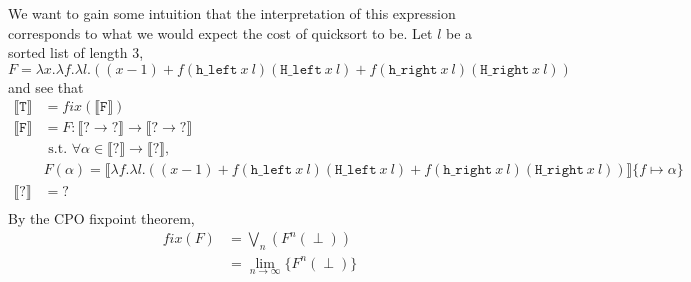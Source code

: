  We want to gain some intuition that the interpretation of this expression corresponds to what we would expect
 the cost of quicksort to be. Let $l$ be a sorted list of length $3$, $F = \lambda x. \lambda f. \lambda l. ((x-1) 
		+ f(\texttt{h\_left} \ x \ l)(\texttt{H\_left} \ x \ l) + f(\texttt{h\_right} \ x \ l)(\texttt{H\_right} \ x \ l))$  and see that
 \begin{align*}
 \llbracket \texttt{T} \rrbracket &= fix(\llbracket \texttt{F} \rrbracket) \\
 \llbracket \texttt{F} \rrbracket &= F : \llbracket \texttt{?} \rightarrow \texttt{?}\rrbracket \rightarrow \llbracket \texttt{?} \rightarrow \texttt{?}\rrbracket \\ 
 &\text{ s.t. } \forall \alpha \in \llbracket \texttt{?}\rrbracket \rightarrow \llbracket \texttt{?} \rrbracket, \\   
 &F(\alpha) = \llbracket\lambda f. \lambda l. ((x-1) 
		+ f(\texttt{h\_left} \ x \ l)(\texttt{H\_left} \ x \ l) + f(\texttt{h\_right} \ x \ l)(\texttt{H\_right} \ x \ l))\rrbracket\{f \mapsto \alpha\} \\
 \llbracket \texttt{?}\rrbracket &= ?  \\
 \end{align*}
 By the CPO fixpoint theorem,  
\begin{align*}
 fix(F) &= \bigvee_n(F^n (\perp)) \\
&= \lim_{n \to \infty}\{F^n (\perp)\}
 \end{align*}
 
 
 